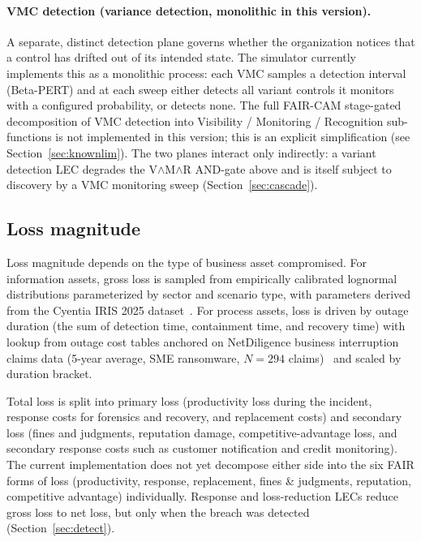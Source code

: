 \documentclass[11pt,a4paper]{article}
\begin{document}
\paragraph{VMC detection (variance detection, monolithic in this version).} A separate, distinct detection plane governs whether the organization notices that a control has drifted out of its intended state. The simulator currently implements this as a monolithic process: each VMC samples a detection interval (Beta-PERT) and at each sweep either detects all variant controls it monitors with a configured probability, or detects none. The full FAIR-CAM stage-gated decomposition of VMC detection into Visibility / Monitoring / Recognition sub-functions is not implemented in this version; this is an explicit simplification (see Section~\ref{sec:knownlim}). The two planes interact only indirectly: a variant detection LEC degrades the V$\wedge$M$\wedge$R AND-gate above and is itself subject to discovery by a VMC monitoring sweep (Section~\ref{sec:cascade}).

\subsection{Loss magnitude}

Loss magnitude depends on the type of business asset compromised. For information assets, gross loss is sampled from empirically calibrated lognormal distributions parameterized by sector and scenario type, with parameters derived from the Cyentia IRIS 2025 dataset~\citep{IRIS2025}. For process assets, loss is driven by outage duration (the sum of detection time, containment time, and recovery time) with lookup from outage cost tables anchored on NetDiligence business interruption claims data (5-year average, SME ransomware, $N=294$ claims)~\citep{NetDiligence2024} and scaled by duration bracket.

Total loss is split into primary loss (productivity loss during the incident, response costs for forensics and recovery, and replacement costs) and secondary loss (fines and judgments, reputation damage, competitive-advantage loss, and secondary response costs such as customer notification and credit monitoring). The current implementation does not yet decompose either side into the six FAIR forms of loss (productivity, response, replacement, fines \& judgments, reputation, competitive advantage) individually. Response and loss-reduction LECs reduce gross loss to net loss, but only when the breach was detected (Section~\ref{sec:detect}).
\end{document}
